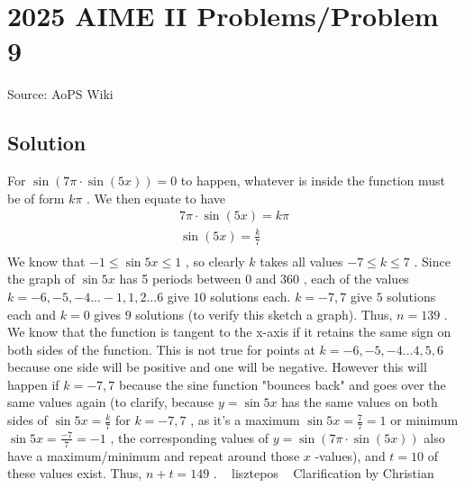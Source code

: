 \documentclass[12pt]{article}
\begin{document}
\section*{{2025 AIME II Problems/Problem 9}}
Source: AoPS Wiki

\subsection*{Solution}
For $\sin(7\pi\cdot\sin(5x))=0$ to happen, whatever is inside the function must be of form $k\pi$ . We then equate to have
\begin{align*}
7\pi\cdot\sin(5x)=k\pi \\
\sin(5x)=\frac{k}{7} \\
\end{align*}
We know that $-1\le \sin{5x} \le 1$ , so clearly $k$ takes all values $-7\le k \le 7$ . Since the graph of $\sin{5x}$ has 5 periods between $0$ and $360$ , each of the values $k=-6,-5,-4...-1,1,2...6$ give $10$ solutions each. $k=-7,7$ give $5$ solutions each and $k=0$ gives $9$ solutions (to verify this sketch a graph). Thus, $n=139$ . We know that the function is tangent to the x-axis if it retains the same sign on both sides of the function. This is not true for points at $k=-6,-5,-4...4,5,6$ because one side will be positive and one will be negative. However this will happen if $k=-7,7$ because the sine function "bounces back" and goes over the same values again (to clarify, because $y=\sin{5x}$ has the same values on both sides of $\sin{5x}=\frac{k}{7}$ for $k=-7,7$ , as it's a maximum $\sin{5x}=\frac{7}{7}=1$ or minimum $\sin{5x}=\frac{-7}{7}=-1$ , the corresponding values of $y=\sin(7\pi\cdot\sin(5x))$ also have a maximum/minimum and repeat around those $x$ -values), and $t=10$ of these values exist.
Thus, $n+t=\boxed{149}$ . ~ lisztepos ~ Clarification by Christian
\end{document}
